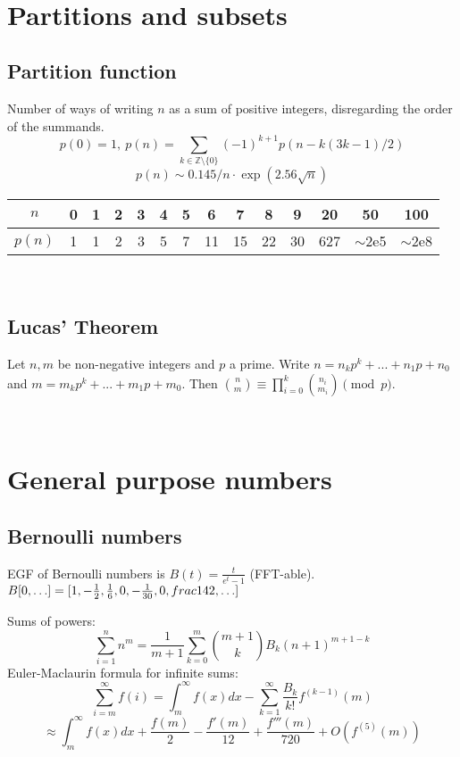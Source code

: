 \

\section{Partitions and subsets}
	\subsection{Partition function}
		Number of ways of writing $n$ as a sum of positive integers, disregarding the order of the summands.
		\small
		\[ p(0) = 1,\ p(n) = \sum_{k \in \mathbb Z \setminus \{0\}}{(-1)^{k+1} p(n - k(3k-1) / 2)} \]
		\[ p(n) \sim 0.145 / n \cdot \exp(2.56 \sqrt{n}) \]

		\begin{center}
		\begin{tabular}{c|c@{\ }c@{\ }c@{\ }c@{\ }c@{\ }c@{\ }c@{\ }c@{\ }c@{\ }c@{\ }c@{\ }c@{\ }c}
			$n$    & 0 & 1 & 2 & 3 & 4 & 5 & 6  & 7  & 8  & 9  & 20  & 50  & 100 \\ \hline
			$p(n)$ & 1 & 1 & 2 & 3 & 5 & 7 & 11 & 15 & 22 & 30 & 627 & $\mathtt{\sim}$2e5 & $\mathtt{\sim}$2e8 \\
		\end{tabular}
		\end{center}
		\normalsize
 
 \

    \subsection{Lucas' Theorem}
		Let $n,m$ be non-negative integers and $p$ a prime. Write $n=n_kp^k+...+n_1p+n_0$ and $m=m_kp^k+...+m_1p+m_0$. Then $\binom{n}{m} \equiv \prod_{i=0}^k\binom{n_i}{m_i} \pmod{p}$.


\


\section{General purpose numbers}
	\subsection{Bernoulli numbers}
		EGF of Bernoulli numbers is $B(t)=\frac{t}{e^t-1}$ (FFT-able).
		$B[0,\ldots] = [1, -\frac{1}{2}, \frac{1}{6}, 0, -\frac{1}{30}, 0, \\frac{1}{42}, \ldots]$

		Sums of powers:
		\small
		\[ \sum_{i=1}^n n^m = \frac{1}{m+1} \sum_{k=0}^m \binom{m+1}{k} B_k (n+1)^{m+1-k} \]
		\normalsize
		Euler-Maclaurin formula for infinite sums:
		\small
		\[ \sum_{i=m}^{\infty} f(i) = \int_m^\infty f(x) dx - \sum_{k=1}^\infty \frac{B_k}{k!}f^{(k-1)}(m) \]
		\[ \approx \int_{m}^\infty f(x)dx + \frac{f(m)}{2} - \frac{f'(m)}{12} + \frac{f'''(m)}{720} + O(f^{(5)}(m)) \]
		\normalsize

